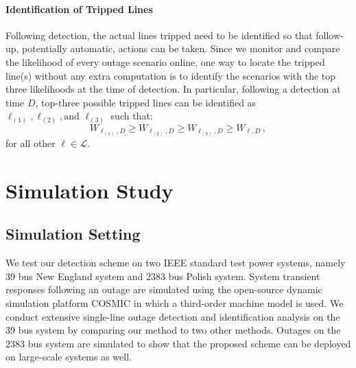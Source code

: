 \paragraph{Identification of Tripped Lines}
Following detection, the actual lines tripped need to be identified so that follow-up, potentially automatic, actions can be taken. 
Since we monitor and compare the likelihood of every outage scenario online, one way to locate the tripped line(s) without any extra computation is to identify the scenarios with the top three likelihoods at the time of detection. In particular, following a detection at time $D$, top-three possible tripped lines can be identified as $\ell_{(1)}, \ell_{(2)}, \text{and } \ell_{(3)}$ such that:
\begin{equation}
\label{eqn:identification}
{W}_{\ell_{(1)}, D} \ge {W}_{\ell_{(2)}, D} \ge {W}_{\ell_{(3)}, D} \ge {W}_{\ell, D}\,,
\end{equation} for all other $\ell \in \mathcal{L}$.




\section{Simulation Study}
\label{sec:results}
\subsection{Simulation Setting}
We test our detection scheme on two IEEE standard test power systems, namely 39 bus New England system \cite{athay1979practical} and 2383 bus Polish system.  System transient responses following an outage are simulated using the open-source dynamic simulation platform COSMIC \cite{Song2016} in which a third-order machine model is used. We conduct extensive single-line outage detection and identification analysis on the 39 bus system by comparing our method to two other methods. Outages on the 2383 bus system are simulated to show that the proposed scheme can be deployed on large-scale systems as well.


